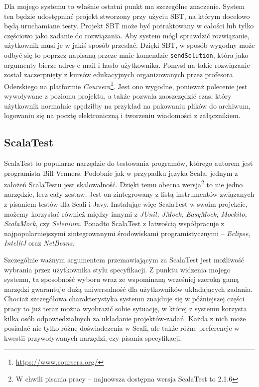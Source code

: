 \documentclass[brudnopis]{xmgr}
\begin{document}
Dla mojego systemu to właśnie ostatni punkt ma szczególne znaczenie. System ten będzie udostępniać projekt stworzony przy użyciu SBT, na którym docelowo będą uruchamiane testy. Projekt SBT może być potraktowany w całości lub tylko częściowo jako zadanie do rozwiązania. Aby system mógł sprawdzić rozwiązanie, użytkownik musi je w jakiś sposób przesłać. Dzięki SBT, w sposób wygodny może odbyć się to poprzez napisaną przeze mnie komendzie \texttt{sendSolution}, która jako argumenty bierze adres e-mail i hasło użytkownika. Pomysł na takie rozwiązanie został zaczerpnięty z kursów edukacyjnych organizowanych przez profesora Oderskiego na platformie \textit{Coursera}\footnote{\url{https://www.coursera.org/}}. Jest ono wygodne, ponieważ polecenie jest wywoływane z poziomu projektu, a także pozwala zaoszczędzić czas, który użytkownik normalnie spędziłby na przykład na pakowaniu plików do archiwum, logowaniu się na pocztę elektroniczną i tworzeniu wiadomości z załącznikiem.

\subsection{ScalaTest}

\label{scalaTestSrodek} 

ScalaTest to popularne narzędzie do testowania programów, którego autorem jest programista Bill Venners. Podobnie jak w przypadku języka Scala, jednym z założeń ScalaTestu jest skalowalność. Dzięki temu obecna wersja\footnote{W chwili pisania pracy -- najnowsza dostępna wersja ScalaTest to 2.1.6} to nie jedno narzędzie, lecz cały zestaw. Jest on zintegrowany z listą instrumentów związanych z pisaniem testów dla Scali i Javy. Instalując więc ScalaTest w swoim projekcie, możemy korzystać również między innymi z \textit{JUnit, JMock, EasyMock, Mockito, ScalaMock}, czy \textit{Selenium}. Ponadto ScalaTest z łatwością współpracuje z najpopularniejszymi zintegrowanymi środowiskami programistycznymi -- \textit{Eclipse}, \textit{IntelliJ} oraz \textit{NetBeans}.

Szczególnie ważnym argumentem przemawiającym za ScalaTest jest możliwość wybrania przez użytkownika stylu specyfikacji. Z punktu widzenia mojego systemu, ta sposobność wyboru wraz ze wspominaną wcześniej szeroką gamą narzędzi gwarantuje dużą uniwersalność dla użytkowników układających zadania. Chociaż szczegółowa charakterystyka systemu znajduje się w późniejszej części pracy to już teraz można wyobrazić sobie sytuację, w której z systemu korzysta kilka osób odpowiedzialnych za układanie projektów-zadań. Każda z nich może posiadać nie tylko różne doświadczenia w Scali, ale także różne preferencje w kwestii przywoływanych narzędzi, czy pisania specyfikacji. 
\end{document}
